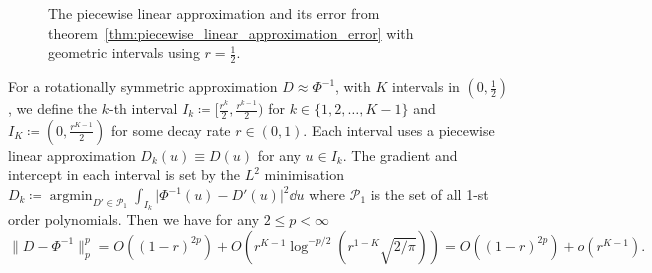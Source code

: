 \documentclass[manuscript,review]{acmart}
\DeclareMathOperator*{\argmin}{argmin} %
\begin{document}
\begin{figure}[htb]
\centering

\hfil
{}\hfil
{}\hfil

\caption{The piecewise linear approximation and its error from theorem~\ref{thm:piecewise_linear_approximation_error} with geometric intervals using $ r = \tfrac{1}{2} $.}
\label{fig:piecewise_linear_approximation}
\end{figure}

\begin{theorem}
\label{thm:piecewise_linear_approximation_error}
For a rotationally symmetric approximation $ D \approx \Phi^{-1}$, with $ K $ intervals in $ (0, \tfrac{1}{2}) $, we define the $ k $-th interval $ I_k \coloneqq [\tfrac{r^k}{2}, \tfrac{r^{k-1}}{2})$ for $ k \in \{1,2,\ldots, K-1\} $ and $ I_K \coloneqq (0, \tfrac{r^{K-1}}{2}) $ for some decay rate $ r \in(0,1) $. Each interval uses a piecewise linear approximation $ D_k(u) \equiv D(u) $ for any $ u \in I_k $. The gradient and intercept in each interval is set by the $ L^2 $ minimisation $ D_k \coloneqq \argmin_{D' \in \mathcal{P}_1} \int_{I_k}\lvert\Phi^{-1}(u) - D'(u)\rvert^2 \dd{u} $ where $ \mathcal{P}_1 $  is the set of all 1-st order polynomials. Then we have for any $ 2 \leq p < \infty  $
\begin{equation*}
\lVert D - \Phi^{-1}\rVert_p^p 
= O((1-r)^{2p}) +
O(r^{K-1} {\log}^{-p/2}(r^{1-K}\sqrt{2/\pi}))  = O((1-r)^{2p}) +
o(r^{K-1}).
\end{equation*}
\end{theorem}
\end{document}
